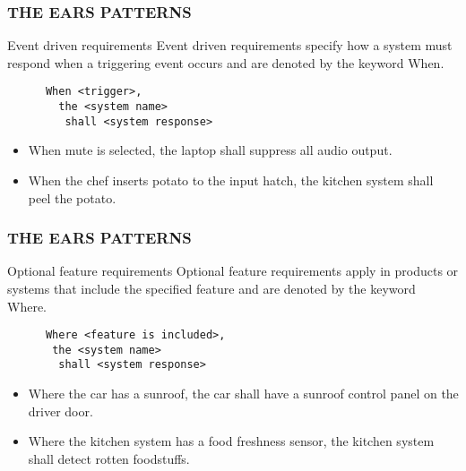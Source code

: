 \documentclass[aspectratio=169]{beamer}
\begin{document}
\begin{frame}[fragile]
  \frametitle{THE EARS PATTERNS}
  \begin{block}{Event driven requirements}
  Event driven requirements specify how a system must respond when a triggering event occurs and are denoted by the keyword When.
    \begin{verbatim}
      When <trigger>, 
        the <system name> 
         shall <system response>
    \end{verbatim}
  \end{block}
  
  \begin{example}
  \begin{itemize}
    \item When mute is selected, the laptop shall suppress all audio output.
    \item When the chef inserts potato to the input hatch, the kitchen system shall peel the potato.
  \end{itemize}
  \end{example}
\end{frame}



\begin{frame}[fragile]
  \frametitle{THE EARS PATTERNS}
  \begin{block}{Optional feature requirements}
  Optional feature requirements apply in products or systems that include the specified feature and are denoted by the keyword Where.
    \begin{verbatim}
      Where <feature is included>, 
       the <system name> 
        shall <system response>
    \end{verbatim}
  \end{block}
  
  \begin{example}
  \begin{itemize}
    \item Where the car has a sunroof, the car shall have a sunroof control panel on the driver door.
    \item Where the kitchen system has a food freshness sensor, the kitchen system shall detect rotten foodstuffs. 
  \end{itemize}
  \end{example}
\end{frame}
\end{document}
